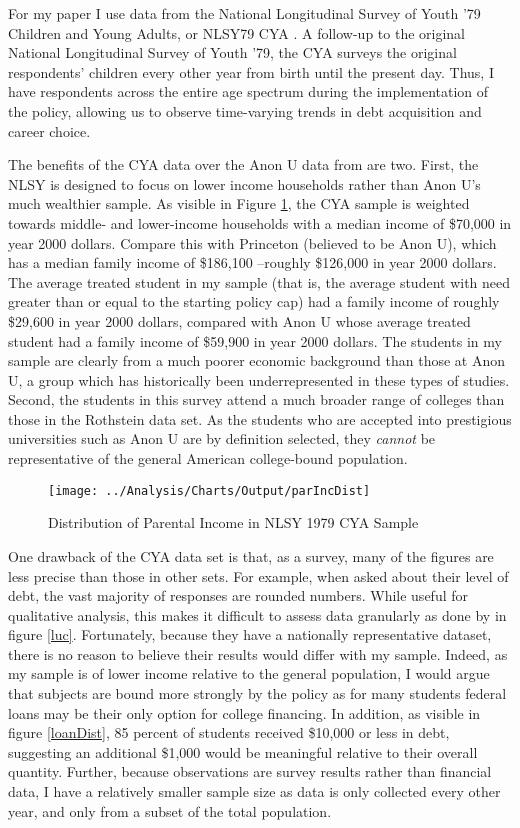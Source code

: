 \documentclass[12pt]{article}
\begin{document}
	For my paper I use data from the National Longitudinal Survey of Youth '79 Children and Young Adults, or NLSY79 CYA \parencite{bls2018}. A follow-up to the original National Longitudinal Survey of Youth '79, the CYA surveys the original respondents' children every other year from birth until the present day. Thus, I have respondents across the entire age spectrum during the implementation of the policy, allowing us to observe time-varying trends in debt acquisition and career choice. 
	
	The benefits of the CYA data over the Anon U data from \textcite{rothstein2011} are two. First, the NLSY is designed to focus on lower income households rather than Anon U's much wealthier sample. As visible in Figure \ref{incDist}, the CYA sample is weighted towards middle- and lower-income households with a median income of \$70,000 in year 2000 dollars. Compare this with Princeton (believed to be Anon U), which has a median family income of \$186,100 \parencite{aisch2017}--roughly \$126,000 in year 2000 dollars. The average treated student in my sample (that is, the average student with need greater than or equal to the starting policy cap) had a family income of roughly \$29,600 in year 2000 dollars, compared with Anon U whose average treated student had a family income of \$59,900 in year 2000 dollars. The students in my sample are clearly from a much poorer economic background than those at Anon U, a group which has historically been underrepresented in these types of studies. Second, the students in this survey attend a much broader range of colleges than those in the Rothstein data set. As the students who are accepted into prestigious universities such as Anon U are by definition selected, they \emph{cannot} be representative of the general American college-bound population. 
	
	\begin{figure}
		\centering
		\caption{Distribution of Parental Income in NLSY 1979 CYA Sample}
		\label{incDist}
		\texttt{[image: ../Analysis/Charts/Output/parIncDist]}
	\end{figure}
	
	One drawback of the CYA data set is that, as a survey, many of the figures are less precise than those in other sets. For example, when asked about their level of debt, the vast majority of responses are rounded numbers. While useful for qualitative analysis, this makes it difficult to assess data granularly as done by \textcite{lucca2018} in figure \ref{luc}. Fortunately, because they have a nationally representative dataset, there is no reason to believe their results would differ with my sample. Indeed, as my sample is of lower income relative to the general population, I would argue that subjects are bound more strongly by the policy as for many students federal loans may be their only option for college financing. In addition, as visible in figure \ref{loanDist}, 85 percent of students received \$10,000 or less in debt, suggesting an additional \$1,000 would be meaningful relative to their overall quantity. Further, because observations are survey results rather than financial data, I have a relatively smaller sample size as data is only collected every other year, and only from a subset of the total population.
	
\end{document}
